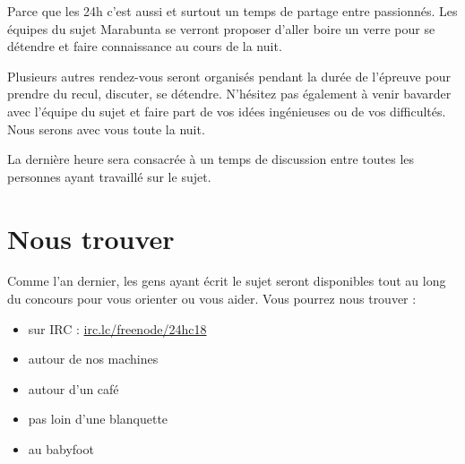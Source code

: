 \documentclass[a4paper, 11pt]{article}
\begin{document}
\textcolor{Sblue}{Parce que les 24h c'est aussi et surtout un temps de partage
entre passionnés. Les équipes du sujet Marabunta se verront proposer d'aller
boire un verre pour se détendre et faire connaissance au cours de la nuit.}

Plusieurs autres rendez-vous seront organisés pendant la durée de l’épreuve pour
prendre du recul, discuter, se détendre. N’hésitez pas également à venir
bavarder avec l’équipe du sujet et faire part de vos idées ingénieuses ou de vos
difficultés. Nous serons avec vous toute la nuit.

La dernière heure sera consacrée à un temps de discussion entre toutes les
personnes ayant travaillé sur le sujet.

	\section{Nous trouver}

Comme l'an dernier, les gens ayant écrit le sujet seront disponibles
tout au long du concours pour vous orienter ou vous aider. Vous pourrez
nous trouver :

\begin{itemize}
	\item sur IRC : \url{irc.lc/freenode/24hc18}
	\item autour de nos machines
	\item autour d'un café
	\item pas loin d'une blanquette
	\item au babyfoot
\end{itemize}
\end{document}
